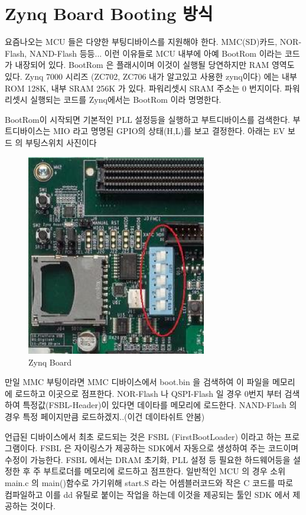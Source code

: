 \documentclass[11pt
  , a4paper
  , article
  , oneside
]{memoir}
\begin{document}
\section{Zynq Board Booting 방식}
요즘나오는 MCU 들은 다양한 부팅디바이스를 지원해야 한다.
MMC(SD)카드, NOR-Flash, NAND-Flash 등등...
이런 이유들로 MCU 내부에 아예 BootRom 이라는 코드가 내장되어 있다.
BootRom 은 플래시이며 이것이 실행될 당연하지만 RAM 영역도 있다.
Zynq 7000 시리즈 (ZC702, ZC706 내가 알고있고 사용한 zynq이다) 에는 내부 ROM 128K, 내부 SRAM 256K 가 있다.
파워리셋시 SRAM 주소는 0 번지이다.
파워리셋시 실행되는 코드를 Zynq에서는 BootRom 이라 명명한다.

BootRom이 시작되면 기본적인 PLL 설정등을 실행하고 부트디바이스를 검색한다.
부트디바이스는 MIO 라고 명명된 GPIO의 상태(H,L)를 보고 결정한다.
아래는 EV 보드 의 부팅스위치 사진이다
\begin{figure}[h!]
	\centering
	\includegraphics[width=0.7\textwidth, height=0.7\textwidth]{./images/zynq_board.eps}
	\caption{Zynq Board}
	\label{fig:zynq_board} 
\end{figure}
만일 MMC 부팅이라면 MMC 디바이스에서 boot.bin 을 검색하여 이 파일을 메모리에 로드하고 이곳으로 점프한다.
NOR-Flash 나 QSPI-Flash 일 경우 0번지 부터 검색하여 특정값(FSBL-Header)이 있다면 데이타를 메모리에 로드한다.
NAND-Flash 의 경우 특정 페이지만큼 로드하겠지..(이건 데이타쉬트 안봄)

언급된 디바이스에서 최초 로드되는 것은 FSBL (FirstBootLoader) 이라고 하는 프로그램이다.
FSBL 은 자이링스가 제공하는 SDK에서 자동으로 생성하여 주는 코드이며 수정이 가능한다.
FSBL 에서는 DRAM 초기화, PLL 설정 등 필요한 하드웨어등을 설정한 후 주 부트로더를 메모리에 로드하고 점프한다.
일반적인 MCU 의 경우 소위 main.c 의 main()함수로 가기위해 start.S 라는 어셈블러코드와 작은 C 코드를 
따로 컴파일하고 이를 dd 유틸로 붙이는 작업을 하는데 이것을 제공되는 툴인 SDK 에서 제공하는 것이다.
\end{document}
